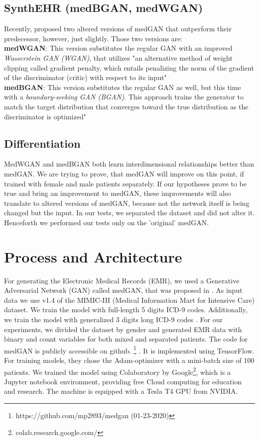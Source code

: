 \documentclass[11pt, a4paper, oneside]{book}
\begin{document}
\subsection{SynthEHR (medBGAN, medWGAN)}
Recently, \citep{Baowaly2018} proposed two altered versions of medGAN that outperform their predecessor, however, just slightly. Those two versions are:
\\
\textbf{medWGAN}: This version substitutes the regular GAN with an improved \textit{Wasserstein GAN (WGAN)}, that utilizes "an alternative method of weight clipping called gradient penalty, which entails penalizing the norm of the gradient of the discriminator (critic) with respect to its input" \citep{Baowaly2018}
\\
\textbf{medBGAN}: This version substitutes the regular GAN as well, but this time with a \textit{boundary-seeking GAN (BGAN)}. This approach trains the generator to match the target distribution that converges toward the true distribution as the discriminator is optimized" \citep{Baowaly2018}
\subsection{Differentiation}
MedWGAN and medBGAN both learn interdimensional relationships better than medGAN. We are trying to prove, that medGAN will improve on this point, if trained with female and male patients separately.
If our hypotheses prove to be true and bring an improvement to medGAN, these improvements will also translate to altered versions of medGAN, because not the network itself is being changed but the input. In our tests, we separated the dataset and did not alter it. Henceforth we performed our tests only on the 'original' medGAN. 
\section{Process and Architecture}
For generating the Electronic Medical Records (EMR), we used a Generative Adversarial Network (GAN) called medGAN, that was proposed in \citep{Choi2017}. As input data we use v1.4 of the MIMIC-III (Medical Information Mart for Intensive Care) dataset. We train the model with full-length 5 digits ICD-9 codes. Additionally, we train the model with generalized 3 digits long ICD-9 codes . For our experiments, we divided the dataset by gender and generated EMR data with binary and count variables for both mixed and separated patients. The code for medGAN is publicly accessible on github. \footnote{https://github.com/mp2893/medgan (01-23-2020)} . It is implemented using TensorFlow.
For training models, they chose the Adam-optimizer with a mini-batch size of 100 patients. \citep{Choi2017} We trained the model using Colaboratory by Google\footnote{colab.research.google.com/}, which is a Jupyter notebook environment, providing free Cloud computing for education and research.
The machine is equipped with a Tesla T4 GPU from NVIDIA.
\end{document}
